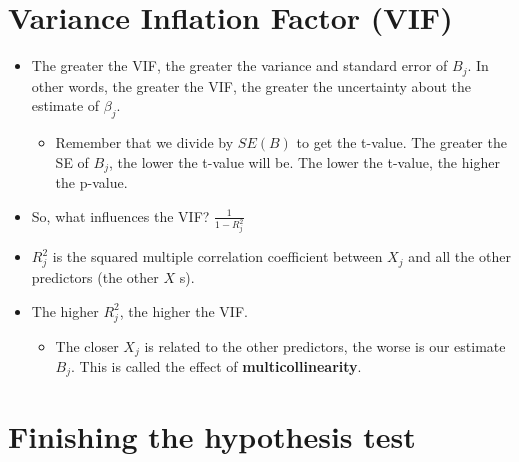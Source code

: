 \documentclass[]{article}
\providecommand{\tightlist}{%
  \setlength{\itemsep}{0pt}\setlength{\parskip}{0pt}}
\begin{document}
\section{Variance Inflation Factor
(VIF)}\label{variance-inflation-factor-vif}

\begin{itemize}
\tightlist
\item
  The greater the VIF, the greater the variance and standard error of
  \(B_j\). In other words, the greater the VIF, the greater the
  uncertainty about the estimate of \(\beta_j\).

  \begin{itemize}
  \tightlist
  \item
    Remember that we divide by \(SE(B)\) to get the t-value. The greater
    the SE of \(B_j\), the lower the t-value will be. The lower the
    t-value, the higher the p-value.
  \end{itemize}
\item
  So, what influences the VIF? \(\frac{1}{1-R_j^2}\)
\item
  \(R_j^2\) is the squared multiple correlation coefficient between
  \(X_j\) and all the other predictors (the other \(X\) s).
\item
  The higher \(R_j^2\), the higher the VIF.

  \begin{itemize}
  \tightlist
  \item
    The closer \(X_j\) is related to the other predictors, the worse is
    our estimate \(B_j\). This is called the effect of
    \textbf{multicollinearity}.
  \end{itemize}
\end{itemize}

\section{Finishing the hypothesis
test}\label{finishing-the-hypothesis-test}
\end{document}

